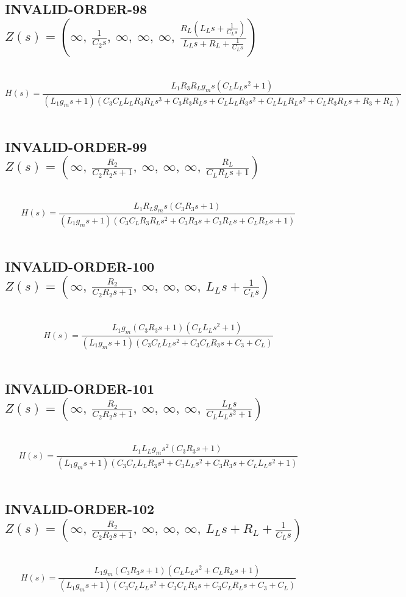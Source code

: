 \documentclass{article}
\begin{document}
\subsection{INVALID-ORDER-98 $Z(s) = \left( \infty, \  \frac{1}{C_{2} s}, \  \infty, \  \infty, \  \infty, \  \frac{R_{L} \left(L_{L} s + \frac{1}{C_{L} s}\right)}{L_{L} s + R_{L} + \frac{1}{C_{L} s}}\right)$ } \ 
\textbf{\[H(s) = \frac{L_{1} R_{3} R_{L} g_{m} s \left(C_{L} L_{L} s^{2} + 1\right)}{\left(L_{1} g_{m} s + 1\right) \left(C_{3} C_{L} L_{L} R_{3} R_{L} s^{3} + C_{3} R_{3} R_{L} s + C_{L} L_{L} R_{3} s^{2} + C_{L} L_{L} R_{L} s^{2} + C_{L} R_{3} R_{L} s + R_{3} + R_{L}\right)}\] } \ 
\subsection{INVALID-ORDER-99 $Z(s) = \left( \infty, \  \frac{R_{2}}{C_{2} R_{2} s + 1}, \  \infty, \  \infty, \  \infty, \  \frac{R_{L}}{C_{L} R_{L} s + 1}\right)$ } \ 
\textbf{\[H(s) = \frac{L_{1} R_{L} g_{m} s \left(C_{3} R_{3} s + 1\right)}{\left(L_{1} g_{m} s + 1\right) \left(C_{3} C_{L} R_{3} R_{L} s^{2} + C_{3} R_{3} s + C_{3} R_{L} s + C_{L} R_{L} s + 1\right)}\] } \ 
\subsection{INVALID-ORDER-100 $Z(s) = \left( \infty, \  \frac{R_{2}}{C_{2} R_{2} s + 1}, \  \infty, \  \infty, \  \infty, \  L_{L} s + \frac{1}{C_{L} s}\right)$ } \ 
\textbf{\[H(s) = \frac{L_{1} g_{m} \left(C_{3} R_{3} s + 1\right) \left(C_{L} L_{L} s^{2} + 1\right)}{\left(L_{1} g_{m} s + 1\right) \left(C_{3} C_{L} L_{L} s^{2} + C_{3} C_{L} R_{3} s + C_{3} + C_{L}\right)}\] } \ 
\subsection{INVALID-ORDER-101 $Z(s) = \left( \infty, \  \frac{R_{2}}{C_{2} R_{2} s + 1}, \  \infty, \  \infty, \  \infty, \  \frac{L_{L} s}{C_{L} L_{L} s^{2} + 1}\right)$ } \ 
\textbf{\[H(s) = \frac{L_{1} L_{L} g_{m} s^{2} \left(C_{3} R_{3} s + 1\right)}{\left(L_{1} g_{m} s + 1\right) \left(C_{3} C_{L} L_{L} R_{3} s^{3} + C_{3} L_{L} s^{2} + C_{3} R_{3} s + C_{L} L_{L} s^{2} + 1\right)}\] } \ 
\subsection{INVALID-ORDER-102 $Z(s) = \left( \infty, \  \frac{R_{2}}{C_{2} R_{2} s + 1}, \  \infty, \  \infty, \  \infty, \  L_{L} s + R_{L} + \frac{1}{C_{L} s}\right)$ } \ 
\textbf{\[H(s) = \frac{L_{1} g_{m} \left(C_{3} R_{3} s + 1\right) \left(C_{L} L_{L} s^{2} + C_{L} R_{L} s + 1\right)}{\left(L_{1} g_{m} s + 1\right) \left(C_{3} C_{L} L_{L} s^{2} + C_{3} C_{L} R_{3} s + C_{3} C_{L} R_{L} s + C_{3} + C_{L}\right)}\] } \ 
\end{document}
